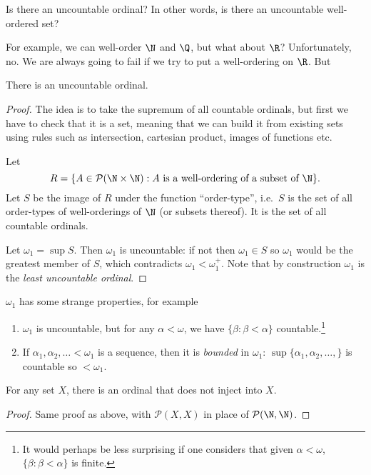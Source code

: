 \documentclass[a4paper]{article}
\begin{document}
Is there an uncountable ordinal? In other words, is there an uncountable well-ordered set?

For example, we can well-order \(\N\) and \(\Q\), but what about \(\R\)? Unfortunately, no. We are always going to fail if we try to put a well-ordering on \(\R\). But

\begin{theorem}
  There is an uncountable ordinal.
\end{theorem}

\begin{proof}
  The idea is to take the supremum of all countable ordinals, but first we have to check that it is a set, meaning that we can build it from existing sets using rules such as intersection, cartesian product, images of functions etc.

  Let
  \[
    R = \{A \in \mathcal P(\N \times \N): A \text{ is a well-ordering of a subset of } \N\}.
  \]
  Let \(S\) be the image of \(R\) under the function ``order-type'', i.e.\ \(S\) is the set of all order-types of well-orderings of \(\N\) (or subsets thereof). It is the set of all countable ordinals.

  Let \(\omega_1 = \sup S\). Then \(\omega_1\) is uncountable: if not then \(\omega_1 \in S\) so \(\omega_1\) would be the greatest member of \(S\), which contradicts \(\omega_1 < \omega_1^+\). Note that by construction \(\omega_1\) is the \emph{least uncountable ordinal}.
\end{proof}

\(\omega_1\) has some strange properties, for example
\begin{enumerate}
\item \(\omega_1\) is uncountable, but for any \(\alpha < \omega\), we have \(\{\beta: \beta < \alpha\}\) countable.\footnote{It would perhaps be less surprising if one considers that given \(\alpha < \omega\), \(\{\beta: \beta < \alpha\}\) is finite.}
\item If \(\alpha_1, \alpha_2, \dots < \omega_1\) is a sequence, then it is \emph{bounded} in \(\omega_1\): \(\sup\{\alpha_1, \alpha_2, \dots,\}\) is countable so \(< \omega_1\).
\end{enumerate}

\begin{theorem}
  For any set \(X\), there is an ordinal that does not inject into \(X\).
\end{theorem}

\begin{proof}
  Same proof as above, with \(\mathcal P(X, X)\) in place of \(\mathcal P(\N, \N)\).
\end{proof}
\end{document}
